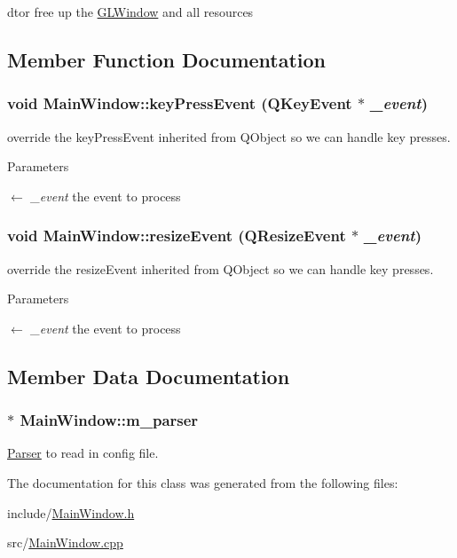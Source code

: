 dtor free up the \hyperlink{classGLWindow}{GLWindow} and all resources 

\subsection{Member Function Documentation}
\hypertarget{classMainWindow_a3c2e352934c6318d405c3d2b0e07729c}{
\subsubsection[{keyPressEvent}]{\setlength{\rightskip}{0pt plus 5cm}void MainWindow::keyPressEvent (QKeyEvent $\ast$ {\em \_\-event})}}
\label{classMainWindow_a3c2e352934c6318d405c3d2b0e07729c}


override the keyPressEvent inherited from QObject so we can handle key presses. 
\begin{DoxyParams}{Parameters}
\item[\mbox{$\leftarrow$} {\em \_\-event}]the event to process \end{DoxyParams}
\hypertarget{classMainWindow_a8ed35ee3d9b815ed32c11d1e13957503}{
\subsubsection[{resizeEvent}]{\setlength{\rightskip}{0pt plus 5cm}void MainWindow::resizeEvent (QResizeEvent $\ast$ {\em \_\-event})}}
\label{classMainWindow_a8ed35ee3d9b815ed32c11d1e13957503}


override the resizeEvent inherited from QObject so we can handle key presses. 
\begin{DoxyParams}{Parameters}
\item[\mbox{$\leftarrow$} {\em \_\-event}]the event to process \end{DoxyParams}


\subsection{Member Data Documentation}
\hypertarget{classMainWindow_ada47ec5452a8928b731bf7167e6d69dc}{
\subsubsection[{m\_\-parser}]{$\ast$ {\bf MainWindow::m\_\-parser}}}
\label{classMainWindow_ada47ec5452a8928b731bf7167e6d69dc}


\hyperlink{classParser}{Parser} to read in config file. 

The documentation for this class was generated from the following files:\begin{DoxyCompactItemize}
\item 
include/\hyperlink{MainWindow_8h}{MainWindow.h}\item 
src/\hyperlink{MainWindow_8cpp}{MainWindow.cpp}\end{DoxyCompactItemize}
